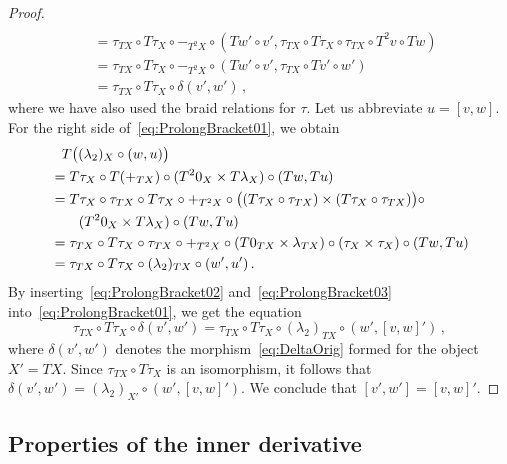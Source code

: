 \documentclass[12pt,reqno, a4paper]{amsart}
\numberwithin{equation}{section}
\theoremstyle{plain}
\theoremstyle{definition}
\theoremstyle{remark}
\begin{document}
\begin{proof}
\begin{equation}
\begin{split}
  \\
  &= \tau_{TX} \circ T\tau_X \circ -_{T^2 X} \circ
     ( Tw' \circ v', \tau_{TX} \circ T\tau_X \circ \tau_{TX} \circ T^2 v \circ Tw )
  \\
  &= \tau_{TX} \circ T\tau_X \circ -_{T^2 X} \circ
     ( Tw' \circ v', \tau_{TX} \circ Tv' \circ w')
  \\
  &= \tau_{TX} \circ T\tau_X \circ \delta(v',w')
  \,,
\end{split}
\end{equation}
where we have also used the braid relations for $\tau$. Let us abbreviate $u = [v,w]$. For the right side of~\eqref{eq:ProlongBracket01}, we obtain
\begin{equation}
\label{eq:ProlongBracket03}
\begin{split}
  &\hphantom{=}{} T\bigl( (\lambda_2)_X \circ (w,u) \bigr)
  \\
  &=
  T\tau_X \circ T(+_{TX}) \circ (T^2 0_X \times T\lambda_X) \circ (Tw,Tu)
  \\
  &=
  T\tau_X \circ \tau_{TX} \circ T\tau_X \circ +_{T^2 X} \circ
  \bigl( (T\tau_X \circ \tau_{TX}) \times (T\tau_X \circ \tau_{TX}) \bigr) \circ
  \\
  &\qquad{}
  (T^2 0_X \times T\lambda_X) \circ (Tw,Tu)
  \\
  &=
  \tau_{TX} \circ T\tau_X \circ \tau_{TX} \circ +_{T^2 X} \circ
  (T0_{TX} \times \lambda_{TX}) \circ (\tau_X \times \tau_X) \circ (Tw,Tu)
  \\
  &=
  \tau_{TX} \circ T\tau_X \circ (\lambda_2)_{TX} \circ (w',u')
  \,.
\end{split}
\end{equation}
By inserting~\eqref{eq:ProlongBracket02} and~\eqref{eq:ProlongBracket03} into~\eqref{eq:ProlongBracket01}, we get the equation
\begin{equation}
  \tau_{TX} \circ T\tau_X \circ \delta(v',w')
  =
  \tau_{TX} \circ T\tau_X \circ (\lambda_2)_{TX} \circ (w', [v,w]')
  \,,
\end{equation}
where $\delta(v',w')$ denotes the morphism~\eqref{eq:DeltaOrig} formed for the object $X' = TX$. Since $\tau_{TX} \circ T\tau_X$ is an isomorphism, it follows that $\delta(v',w') = (\lambda_2)_{X'} \circ (w', [v,w]')$. We conclude that $[v',w'] = [v,w]'$.
\end{proof}



\subsection{Properties of the inner derivative}
\end{document}
